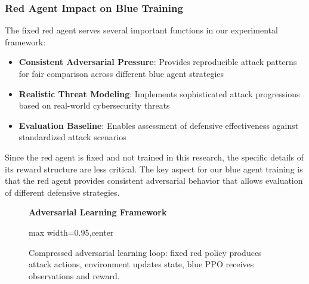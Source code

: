\documentclass[12pt,twoside]{article}
\theoremstyle{definition}
\theoremstyle{plain}
\begin{document}
\subsubsection{Red Agent Impact on Blue Training}
The fixed red agent serves several important functions in our experimental framework:
\begin{itemize}
\item \textbf{Consistent Adversarial Pressure}: Provides reproducible attack patterns for fair comparison across different blue agent strategies
\item \textbf{Realistic Threat Modeling}: Implements sophisticated attack progressions based on real-world cybersecurity threats
\item \textbf{Evaluation Baseline}: Enables assessment of defensive effectiveness against standardized attack scenarios
\end{itemize}

Since the red agent is fixed and not trained in this research, the specific details of its reward structure are less critical. The key aspect for our blue agent training is that the red agent provides consistent adversarial behavior that allows evaluation of different defensive strategies.

\begin{figure}[H]
\centering
\textbf{Adversarial Learning Framework}
\medskip
\begin{adjustbox}{max width=0.95\linewidth,center}
\end{adjustbox}
\caption{Compressed adversarial learning loop: fixed red policy produces attack actions, environment updates state, blue PPO receives observations and reward.}
\label{fig:adversarial_framework}
\end{figure}
\end{document}
